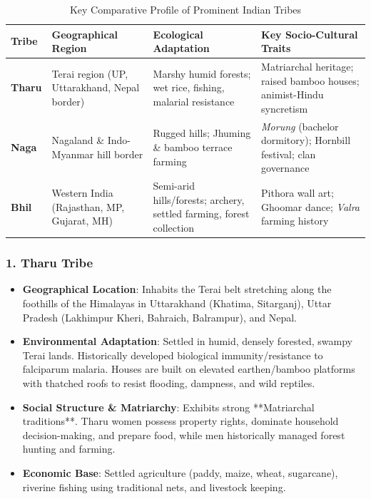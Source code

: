 \documentclass[11pt,a4paper]{article}
\begin{document}
\begin{table}[h!]
\centering
\small
\begin{tabularx}{\textwidth}{l X X X}
\toprule
\textbf{Tribe} & \textbf{Geographical Region} & \textbf{Ecological Adaptation} & \textbf{Key Socio-Cultural Traits} \\
\midrule
\textbf{Tharu} & Terai region (UP, Uttarakhand, Nepal border) & Marshy humid forests; wet rice, fishing, malarial resistance & Matriarchal heritage; raised bamboo houses; animist-Hindu syncretism \\
\midrule
\textbf{Naga} & Nagaland \& Indo-Myanmar hill border & Rugged hills; Jhuming \& bamboo terrace farming & \textit{Morung} (bachelor dormitory); Hornbill festival; clan governance \\
\midrule
\textbf{Bhil} & Western India (Rajasthan, MP, Gujarat, MH) & Semi-arid hills/forests; archery, settled farming, forest collection & Pithora wall art; Ghoomar dance; \textit{Valra} farming history \\
\bottomrule
\end{tabularx}
\caption{Key Comparative Profile of Prominent Indian Tribes}
\end{table}

\subsubsection{1. Tharu Tribe}
\begin{itemize}[leftmargin=*]
  \item \textbf{Geographical Location}: Inhabits the Terai belt stretching along the foothills of the Himalayas in Uttarakhand (Khatima, Sitarganj), Uttar Pradesh (Lakhimpur Kheri, Bahraich, Balrampur), and Nepal.
  \item \textbf{Environmental Adaptation}: Settled in humid, densely forested, swampy Terai lands. Historically developed biological immunity/resistance to falciparum malaria. Houses are built on elevated earthen/bamboo platforms with thatched roofs to resist flooding, dampness, and wild reptiles.
  \item \textbf{Social Structure \& Matriarchy}: Exhibits strong **Matriarchal traditions**. Tharu women possess property rights, dominate household decision-making, and prepare food, while men historically managed forest hunting and farming.
  \item \textbf{Economic Base}: Settled agriculture (paddy, maize, wheat, sugarcane), riverine fishing using traditional nets, and livestock keeping.
\end{itemize}
\end{document}
